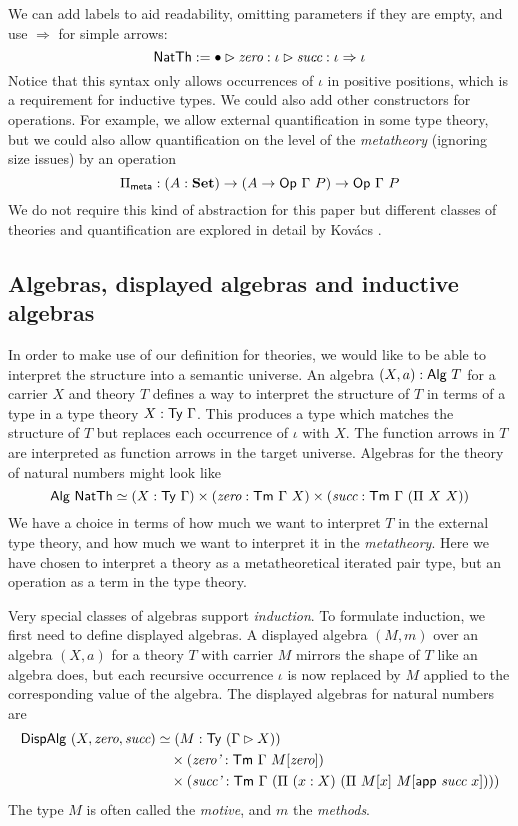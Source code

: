 We can add labels to aid readability, omitting parameters
if they are empty, and use $\Rightarrow$ for simple arrows:
\[
\textsf{NatTh} := \bullet \rhd \textit{zero} : \iota \rhd \textit{succ} : \iota \Rightarrow \iota
\]
Notice that this syntax only allows occurrences of $\iota$ in positive
positions, which is a requirement for inductive types.
We could also add other constructors for operations. For example, we allow
external quantification in some type theory, but we could also allow quantification
on the level of the \emph{metatheory} (ignoring size issues) by an operation
\[
\Pi_{\mta{meta}} : (A : \Set) \to (A \to \mta{Op}\ \Gamma\ P) \to \mta{Op}\ \Gamma\ P
\]
We do not require this kind of abstraction for this paper but different classes of
theories and quantification are explored in detail by Kov\'acs \cite{Kovacs2023-gq}.

\subsection{Algebras, displayed algebras and inductive algebras} \label{sub:algebras}

In order to make use of our definition for theories, we would like to be able to interpret
the structure into a semantic universe. An algebra $(X, a) : \textsf{Alg}\ T$
for a carrier $X$ and theory $T$ defines a way to interpret the structure of $T$
in terms of a type in a type theory $X : \textsf{Ty}\ \Gamma$. This produces a type which
matches the structure of $T$ but replaces each occurrence of $\iota$ with $X$.
The function arrows in $T$ are interpreted as function arrows in the target universe.
Algebras for the theory of natural numbers might look like
\[
	\mta{Alg}\ \mta{NatTh}\simeq (X : \Ty\ \Gamma) \times (\textit{zero} : \Tm\ \Gamma\ X) \times (\textit{succ} : \Tm\ \Gamma\ (\Pi\ X\ X))
\]
We have a choice in terms of how much we want to interpret $T$ in the external type theory,
and how much we want to interpret it in the \emph{metatheory}. Here we have chosen to interpret
a theory as a metatheoretical iterated pair type, but an operation as a term in the type theory.

Very special classes of algebras support \emph{induction}.
To formulate induction, we first need to define displayed algebras.
A displayed algebra $(M, m)$ over an algebra $(X, a)$ for a theory $T$ with
carrier $M$ mirrors the shape of $T$ like an algebra does, but each recursive
occurrence $\iota$ is now replaced by $M$ applied to the corresponding value of
the algebra. The displayed algebras for natural numbers are
\begin{align*}
	\mta{DispAlg}\ (X, \textit{zero}, \textit{succ}) & \simeq (M : \Ty\ (\Gamma \rhd X))                                                      \\
	                               & \quad \times (\textit{zero'} : \Tm\ \Gamma\ M[\textit{zero}])                                            \\
	                               & \quad \times (\textit{succ'} : \Tm\ \Gamma\ (\Pi\ (x : X)\ (\Pi\ M[x]\ M[\mta{app}\ \textit{succ}\ x])))
\end{align*}
The type $M$ is often called the \emph{motive}, and $m$ the \emph{methods}.

